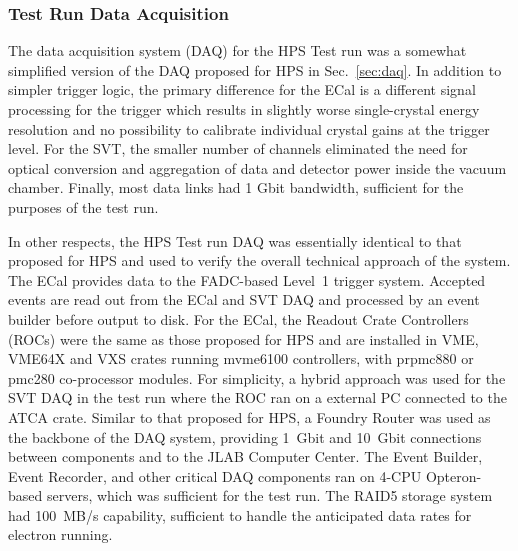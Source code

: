 
\subsubsection{Test Run Data Acquisition}
\label{sec:testrun_daq}


The data acquisition system (DAQ) for the HPS Test run was a somewhat simplified version of the DAQ proposed for HPS in Sec.~\ref{sec:daq}. In addition to simpler trigger logic, the primary difference for the ECal is a different signal processing for the trigger which results in slightly worse single-crystal energy resolution and no possibility to calibrate individual crystal gains at the trigger level.  For the SVT, the smaller
number of channels eliminated the need for optical conversion and aggregation of data and detector power inside the vacuum chamber.
Finally, most data links had 1 Gbit bandwidth, sufficient for the purposes of the test run.

In other respects, the HPS Test run DAQ was essentially identical to that proposed for HPS and used to verify the overall technical approach of the system. The ECal provides data to the FADC-based Level~1
trigger system. Accepted events are read out from the ECal and SVT DAQ and processed by an event builder before output to disk.
For the ECal, the Readout Crate Controllers (ROCs) were the same as those proposed for HPS and are installed in VME, VME64X and VXS 
crates running mvme6100 controllers, with prpmc880 or pmc280 co-processor modules. For simplicity, a hybrid approach was 
used for the SVT DAQ in the test run where the ROC ran on a external PC connected to the ATCA crate. Similar to that proposed for HPS, a 
Foundry Router was used as the backbone of the DAQ system, providing 1~Gbit and 10~Gbit connections between components 
and to the JLAB Computer Center. The Event Builder, Event Recorder, and other critical DAQ components ran on 4-CPU Opteron-based servers, 
which was sufficient for the test run. The RAID5 storage system had 100~MB/s capability, sufficient to handle the anticipated data rates for electron running.


